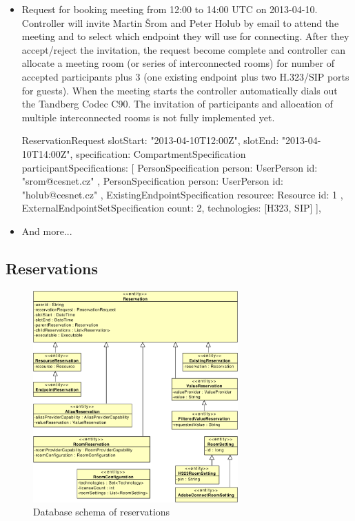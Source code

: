 \begin{itemize}
\newpage
\item Request for booking meeting from 12:00 to 14:00 UTC on 2013-04-10. Controller will invite Martin Šrom and Peter Holub by email to attend the meeting and to select which endpoint they will use for connecting. After they accept/reject the invitation, the request become complete and controller can allocate a meeting room (or series of interconnected rooms) for number of accepted participants plus 3 (one existing endpoint plus two H.323/SIP ports for guests). When the meeting starts the controller automatically dials out the Tandberg Codec C90. The invitation of participants and allocation of multiple interconnected rooms is not fully implemented yet.
\begin{Entity}
ReservationRequest {
  slotStart: "2013-04-10T12:00Z",
  slotEnd:   "2013-04-10T14:00Z",
  specification: CompartmentSpecification {
    participantSpecifications: [
      PersonSpecification {
        person: UserPerson { id: "srom@cesnet.cz"}
      },
      PersonSpecification {
        person: UserPerson { id: "holub@cesnet.cz"}
      },      
      ExistingEndpointSpecification { 
        resource: Resource { id: 1 } 
      },
      ExternalEndpointSetSpecification {
        count: 2,
        technologies: [H323, SIP]
      }
    ],    
  }
}
\end{Entity}

\item And more...

\end{itemize}



\cleardoublepage
\subsection{Reservations}

\begin{figure}[ht!]
\centering\includegraphics[width=0.7\textwidth]{diagrams/cd_reservations}
\caption{Database schema of reservations}
\label{fig:reservations}
\end{figure}




